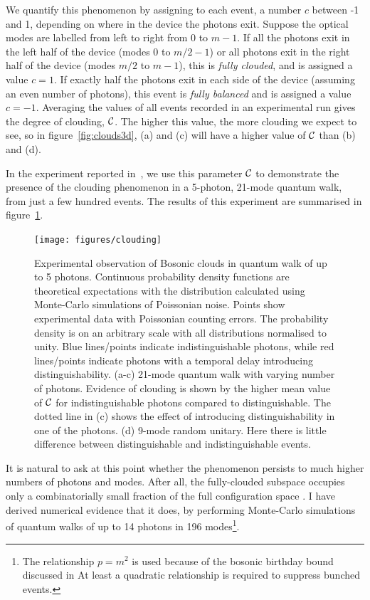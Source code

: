 We quantify this phenomenon by assigning to each event, a number \(c\) between
-1 and 1, depending on where in the device the photons exit. Suppose the optical
modes are labelled from left to right from 0 to \(m-1\). If all the photons exit
in the left half of the device (modes 0 to \(m/2-1\)) or all photons exit in the
right half of the device (modes \(m/2\) to \(m-1\)), this is \emph{fully
clouded}, and is assigned a value \(c=1\). If exactly half the photons exit in
each side of the device (assuming an even number of photons), this event is
\emph{fully balanced} and is assigned a value \(c=-1\). Averaging the values of
all events recorded in an experimental run gives the degree of clouding,
\(\mathcal{C}\). The higher this value, the more clouding we expect to see, so in
figure~\ref{fig:clouds3d}, (a) and (c) will have a higher value of \(\mathcal{C}\)
than (b) and (d).

In the experiment reported in~\cite{verification}, we use this parameter
\(\mathcal{C}\) to demonstrate the presence of the clouding phenomenon in a
5-photon, 21-mode quantum walk, from just a few hundred  events.
The results of this experiment are summarised in figure~\ref{fig:clouding}.

\begin{figure}[h]
  \centering
  \texttt{[image: figures/clouding]}
  \caption[Experimental observation of Bosonic clouds in quantum walks of up to
  5 photons]
  {Experimental observation of Bosonic clouds in quantum walk of up to 5
  photons. Continuous probability density functions are theoretical expectations
  with the distribution calculated using Monte-Carlo simulations of Poissonian
  noise. Points show experimental data with Poissonian counting errors. The
  probability density is on an arbitrary scale with all distributions normalised
  to unity. Blue lines/points indicate indistinguishable photons, while red
  lines/points indicate photons with a temporal delay introducing
  distinguishability. (a-c) 21-mode quantum walk with varying number of photons.
  Evidence of clouding is shown by the higher mean value of \(\mathcal{C}\) for
  indistinguishable photons compared to distinguishable.
  The dotted line in (c) shows the effect of introducing distinguishability
  in one of the photons. (d) 9-mode random unitary. Here there is little
  difference between distinguishable and indistinguishable events.}
  \label{fig:clouding}
\end{figure}

It is natural to ask at this point whether the phenomenon persists to much
higher numbers of photons and modes. After all, the fully-clouded subspace
occupies only a combinatorially small fraction of the full configuration space
. I have derived numerical evidence that it does, by performing
Monte-Carlo simulations of quantum walks of up to 14 photons in 196
modes\footnote{The relationship \(p=m^{2}\) is used because of the bosonic
birthday bound discussed in \cite{bosonsampling, birthdays,
experimental-birthdays} At least a quadratic relationship is required to
suppress bunched events.}.


